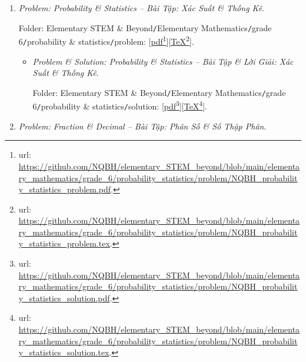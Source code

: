 \documentclass[12pt]{article}
\begin{document}
\begin{enumerate}
\begin{itemize}
		Folder: {\sf Elementary STEM \& Beyond{\tt/}Elementary Mathematics{\tt/}grade 6{\tt/}visual geometry{\tt/}solution}: [\href{https://github.com/NQBH/elementary_STEM_beyond/blob/main/elementary_mathematics/grade_6/visual_geometry/problem/NQBH_visual_geometry_solution.pdf}{pdf}\footnote{{\sc url}: \url{https://github.com/NQBH/elementary_STEM_beyond/blob/main/elementary_mathematics/grade_6/visual_geometry/problem/NQBH_visual_geometry_solution.pdf}.}][\href{https://github.com/NQBH/elementary_STEM_beyond/blob/main/elementary_mathematics/grade_6/visual_geometry/problem/NQBH_visual_geometry_solution.tex}{\TeX}\footnote{{\sc url}: \url{https://github.com/NQBH/elementary_STEM_beyond/blob/main/elementary_mathematics/grade_6/visual_geometry/problem/NQBH_visual_geometry_solution.tex}.}].
	\end{itemize}
	\item {\it Problem: Probability {\it\&} Statistics -- Bài Tập: Xác Suất {\it\&} Thống Kê}.
	
	Folder: {\sf Elementary STEM \& Beyond{\tt/}Elementary Mathematics{\tt/}grade 6{\tt/}probability \& statistics{\tt/}problem}: [\href{https://github.com/NQBH/elementary_STEM_beyond/blob/main/elementary_mathematics/grade_6/probability_statistics/problem/NQBH_probability_statistics_problem.pdf}{pdf}\footnote{{\sc url}: \url{https://github.com/NQBH/elementary_STEM_beyond/blob/main/elementary_mathematics/grade_6/probability_statistics/problem/NQBH_probability_statistics_problem.pdf}.}][\href{https://github.com/NQBH/elementary_STEM_beyond/blob/main/elementary_mathematics/grade_6/probability_statistics/problem/NQBH_probability_statistics_problem.tex}{\TeX}\footnote{{\sc url}: \url{https://github.com/NQBH/elementary_STEM_beyond/blob/main/elementary_mathematics/grade_6/probability_statistics/problem/NQBH_probability_statistics_problem.tex}.}].
	\begin{itemize}
		\item {\it Problem \& Solution: Probability {\it\&} Statistics -- Bài Tập \& Lời Giải: Xác Suất {\it\&} Thống Kê}.
		
		Folder: {\sf Elementary STEM \& Beyond{\tt/}Elementary Mathematics{\tt/}grade 6{\tt/}probability \& statistics{\tt/}solution}: [\href{https://github.com/NQBH/elementary_STEM_beyond/blob/main/elementary_mathematics/grade_6/probability_statistics/problem/NQBH_probability_statistics_solution.pdf}{pdf}\footnote{{\sc url}: \url{https://github.com/NQBH/elementary_STEM_beyond/blob/main/elementary_mathematics/grade_6/probability_statistics/problem/NQBH_probability_statistics_solution.pdf}.}][\href{https://github.com/NQBH/elementary_STEM_beyond/blob/main/elementary_mathematics/grade_6/probability_statistics/problem/NQBH_probability_statistics_solution.tex}{\TeX}\footnote{{\sc url}: \url{https://github.com/NQBH/elementary_STEM_beyond/blob/main/elementary_mathematics/grade_6/probability_statistics/problem/NQBH_probability_statistics_solution.tex}.}].
	\end{itemize}	
	\item {\it Problem: Fraction \& Decimal -- Bài Tập: Phân Số {\it\&} Số Thập Phân}.
	

\end{enumerate}
\end{document}
